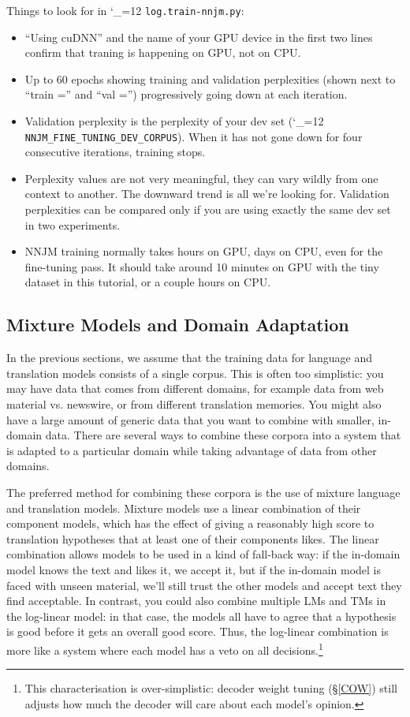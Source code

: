 \documentclass[11pt,letterpaper]{article}
\def\code{\begingroup\catcode`\_=12 \codex}
\newcommand{\codex}[1]{\texttt{#1}\endgroup}
\begin{document}
Things to look for in \code{log.train-nnjm.py}:
\begin{itemize}
   \item ``Using cuDNN'' and the name of your GPU device in the first two lines
      confirm that traning is happening on GPU, not on CPU.
   \item Up to 60 epochs showing training and validation perplexities (shown
      next to ``train ='' and ``val ='') progressively going down at each
      iteration.
   \item Validation perplexity is the perplexity of your dev set
      (\code{NNJM_FINE_TUNING_DEV_CORPUS}). When it has not gone down for four
      consecutive iterations, training stops.
   \item Perplexity values are not very meaningful, they can vary wildly from
      one context to another. The downward trend is all we're looking for.
      Validation perplexities can be compared only if you are using exactly the
      same dev set in two experiments.
   \item NNJM training normally takes hours on GPU, days on CPU, even for the
      fine-tuning pass. It should take around 10 minutes on GPU with the tiny
      dataset in this tutorial, or a couple hours on CPU.
\end{itemize}

\subsection{Mixture Models and Domain Adaptation} \label{MIX}

In the previous sections, we assume that the training data for
language and translation models consists of a single corpus.  This is often too
simplistic: you may have data that comes from different domains, for example
data from web material vs. newswire, or from different translation memories.
You might also have a large amount of generic data that you want to combine
with smaller, in-domain data.  There are several ways to combine these corpora
into a system that is adapted to a particular domain while taking advantage of
data from other domains.

The preferred method for combining these corpora is the use of mixture language
and translation models.
Mixture models use a linear combination of their component models, which has
the effect of giving a reasonably high score to translation hypotheses that at least
one of their components likes.  The linear combination allows models to
be used in a kind of fall-back way: if the in-domain model knows the text and
likes it, we accept it, but if the in-domain model is faced with unseen
material, we'll still trust the other models and accept text they find
acceptable.  In contrast, you could also combine multiple LMs and TMs in the
log-linear model: in that case, the models all have to agree that a hypothesis
is good before it gets an overall good score.  Thus, the log-linear combination
is more like a system where each model has a veto on all
decisions.\footnote{This characterisation is over-simplistic: decoder weight
tuning (\S\ref{COW}) still adjusts how much the decoder will care about each
model's opinion.}
\end{document}
